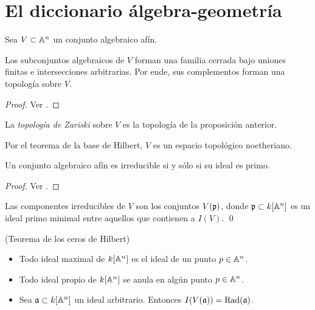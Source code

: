 \section{El diccionario álgebra-geometría}

\begin{preliminaries}
Sea $V \subset \mathbb A^n$ un conjunto algebraico afín.
\end{preliminaries}

\begin{proposition}
Los subconjuntos algebraicos de $V$ forman una familia cerrada bajo uniones finitas e intersecciones arbitrarias. Por ende, sus complementos forman una topología sobre $V$.
\end{proposition}

\begin{proof}
Ver \cite[p. 2]{hartshorne}.
\end{proof}

\begin{definition}
La \textit{topología de Zariski} sobre $V$ es la topología de la proposición anterior.
\end{definition}

\begin{remark}
Por el teorema de la base de Hilbert, $V$ es un espacio topológico noetheriano.
\end{remark}

\begin{proposition}
Un conjunto algebraico afín es irreducible si y sólo si su ideal es primo.
\end{proposition}

\begin{proof}
Ver \cite[p. 15]{fulton}.
\end{proof}

\begin{corollary}
Las componentes irreducibles de $V$ son los conjuntos $V(\mathfrak p)$, donde $\mathfrak p \subset k[\mathbb A^n]$ es un ideal primo minimal entre aquellos que contienen a $I(V)$. \qed
\end{corollary}

\begin{theorem}
(Teorema de los ceros de Hilbert)

\begin{itemize}
    \item Todo ideal maximal de $k[\mathbb A^n]$ es el ideal de un punto $p \in \mathbb A^n$.
    \item Todo ideal propio de $k[\mathbb A^n]$ se anula en algún punto $p \in \mathbb A^n$.
    \item Sea $\mathfrak a \subset k[\mathbb A^n]$ un ideal arbitrario. Entonces $I(V(\mathfrak a)) = \operatorname{Rad}(\mathfrak a)$.
\end{itemize}
\end{theorem}

